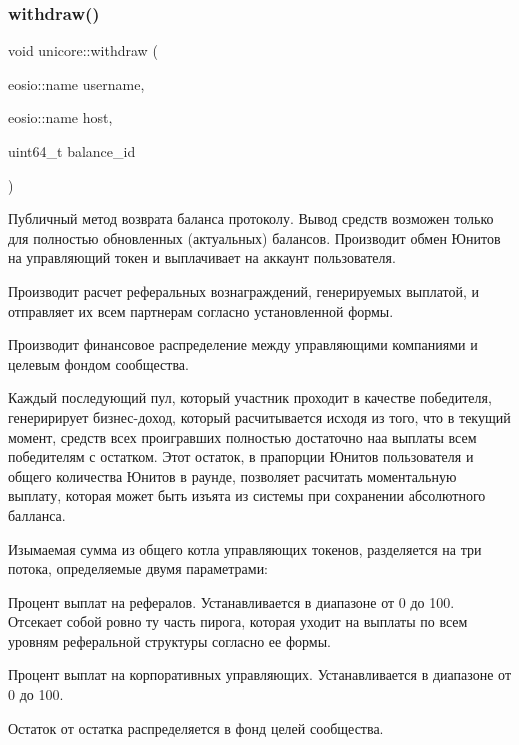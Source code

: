 \subsubsection{\texorpdfstring{withdraw()}{withdraw()}}
{\footnotesize\ttfamily void unicore\+::withdraw (\begin{DoxyParamCaption}\item[{eosio\+::name}]{username,  }\item[{eosio\+::name}]{host,  }\item[{uint64\+\_\+t}]{balance\+\_\+id }\end{DoxyParamCaption})}



Публичный метод возврата баланса протоколу. Вывод средств возможен только для полностью обновленных (актуальных) балансов. Производит обмен Юнитов на управляющий токен и выплачивает на аккаунт пользователя. 

Производит расчет реферальных вознаграждений, генерируемых выплатой, и отправляет их всем партнерам согласно установленной формы.

Производит финансовое распределение между управляющими компаниями и целевым фондом сообщества.

Каждый последующий пул, который участник проходит в качестве победителя, генеририрует бизнес-\/доход, который расчитывается исходя из того, что в текущий момент, средств всех проигравших полностью достаточно наа выплаты всем победителям с остатком. Этот остаток, в прапорции Юнитов пользователя и общего количества Юнитов в раунде, позволяет расчитать моментальную выплату, которая может быть изъята из системы при сохранении абсолютного балланса.

Изымаемая сумма из общего котла управляющих токенов, разделяется на три потока, определяемые двумя параметрами\+:
\begin{DoxyItemize}
\item Процент выплат на рефералов. Устанавливается в диапазоне от 0 до 100. Отсекает собой ровно ту часть пирога, которая уходит на выплаты по всем уровням реферальной структуры согласно ее формы.
\item Процент выплат на корпоративных управляющих. Устанавливается в диапазоне от 0 до 100.
\item Остаток от остатка распределяется в фонд целей сообщества.
\end{DoxyItemize}

